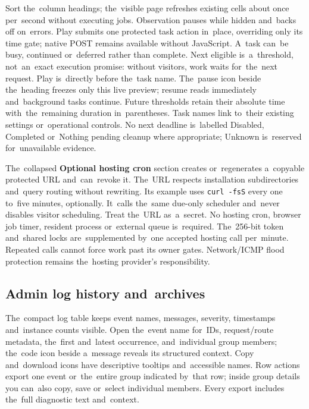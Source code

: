 \documentclass[11pt,a4paper]{article}
\newcommand{\ui}[1]{\textbf{#1}}
\newcommand{\codeword}[1]{\nolinkurl{#1}}
\begin{document}
Sort the~column headings; the~visible page refreshes existing cells about once
per~second without executing jobs. Observation pauses while hidden and~backs off
on~errors. Play submits one protected task action in~place, overriding only
its time gate; native POST remains available without JavaScript. A~task can~be
busy, continued or~deferred rather than complete. Next eligible is~a~threshold,
not~an~exact execution promise: without visitors, work waits for~the~next
request.
Play is~directly before the~task name. The~pause icon beside the~heading freezes
only this live preview; resume reads immediately and~background tasks continue.
Future thresholds retain their absolute time with~the~remaining duration
in~parentheses.
Task names link to~their existing settings or~operational controls. No next
deadline is~labelled Disabled, Completed or~Nothing pending cleanup where
appropriate; Unknown is~reserved for~unavailable evidence.

The~collapsed \ui{Optional hosting cron} section creates or~regenerates
a~copyable
protected URL and~can~revoke it. The~URL respects installation subdirectories
and~query routing without rewriting. Its example uses \codeword{curl -fsS} every
one to~five minutes, optionally. It~calls the~same due-only scheduler and~never
disables visitor scheduling. Treat the~URL as~a~secret. No hosting cron, browser
job timer, resident process or~external queue is~required.
The~256-bit token and~shared locks are~supplemented by~one accepted hosting call
per~minute. Repeated calls cannot force work past its owner gates. Network/ICMP
flood protection remains the~hosting provider's responsibility.

\subsection{Admin log history and~archives}

The~compact log table keeps event names, messages, severity, timestamps
and~instance counts visible. Open the~event name for~IDs, request/route
metadata, the~first and~latest occurrence, and~individual group members;
the~code icon beside a~message reveals its structured context. Copy and~download
icons have descriptive tooltips and~accessible names. Row actions export one
event or~the~entire group indicated by~that row; inside group details you
can~also copy, save or~select individual members. Every export includes the~full
diagnostic text and~context.
\end{document}
